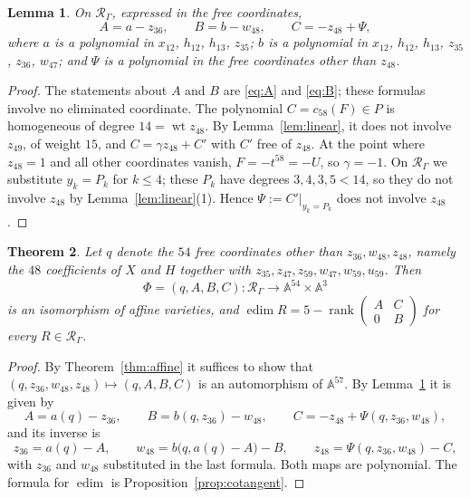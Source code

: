 \documentclass{amsart}
\newtheorem{theorem}{Theorem}[section]
\newtheorem{lemma}[theorem]{Lemma}
\theoremstyle{definition}
\theoremstyle{remark}
\numberwithin{equation}{section}
\newcommand{\AF}{\mathbb{A}}
\newcommand{\Rs}{\mathcal{R}_\Gamma}
\DeclareMathOperator{\edim}{edim}
\DeclareMathOperator{\rank}{rank}
\DeclareMathOperator{\wt}{wt}
\begin{document}
\begin{lemma}\label{lem:C}
On $\Rs$, expressed in the free coordinates,
\[
A=a-z_{36},\qquad B=b-w_{48},\qquad C=-z_{48}+\Psi,
\]
where $a$ is a polynomial in $x_{12}$, $h_{12}$, $h_{13}$, $z_{35}$; $b$ is a polynomial in $x_{12}$, $h_{12}$, $h_{13}$, $z_{35}$, $z_{36}$, $w_{47}$; and $\Psi$ is a polynomial in the free coordinates other than $z_{48}$.
\end{lemma}

\begin{proof}
The statements about $A$ and $B$ are \eqref{eq:A} and \eqref{eq:B}; these formulas involve no eliminated coordinate. The polynomial $C=c_{58}(F)\in P$ is homogeneous of degree $14=\wt z_{48}$. By Lemma~\ref{lem:linear}, it does not involve $z_{49}$, of weight $15$, and $C=\gamma z_{48}+C'$ with $C'$ free of $z_{48}$. At the point where $z_{48}=1$ and all other coordinates vanish, $F=-t^{58}=-U$, so $\gamma=-1$. On $\Rs$ we substitute $y_k=P_k$ for $k\le4$; these $P_k$ have degrees $3,4,3,5<14$, so they do not involve $z_{48}$ by Lemma~\ref{lem:linear}(1). Hence $\Psi:=C'|_{y_k=P_k}$ does not involve $z_{48}$.
\end{proof}

\begin{theorem}\label{thm:coords}
Let $q$ denote the $54$ free coordinates other than $z_{36},w_{48},z_{48}$, namely the $48$ coefficients of $X$ and $H$ together with $z_{35},z_{47},z_{59},w_{47},w_{59},u_{59}$. Then
\[
\Phi=(q,A,B,C)\colon\Rs\longrightarrow\AF^{54}\times\AF^3
\]
is an isomorphism of affine varieties, and $\edim R=5-\rank\left(\begin{smallmatrix}A&C\\0&B\end{smallmatrix}\right)$ for every $R\in\Rs$.
\end{theorem}

\begin{proof}
By Theorem~\ref{thm:affine} it suffices to show that $(q,z_{36},w_{48},z_{48})\mapsto(q,A,B,C)$ is an automorphism of $\AF^{57}$. By Lemma~\ref{lem:C} it is given by
\[
A=a(q)-z_{36},\qquad B=b(q,z_{36})-w_{48},\qquad C=-z_{48}+\Psi(q,z_{36},w_{48}),
\]
and its inverse is
\[
z_{36}=a(q)-A,\qquad w_{48}=b\bigl(q,a(q)-A\bigr)-B,\qquad z_{48}=\Psi(q,z_{36},w_{48})-C,
\]
with $z_{36}$ and $w_{48}$ substituted in the last formula. Both maps are polynomial. The formula for $\edim$ is Proposition~\ref{prop:cotangent}.
\end{proof}
\end{document}
